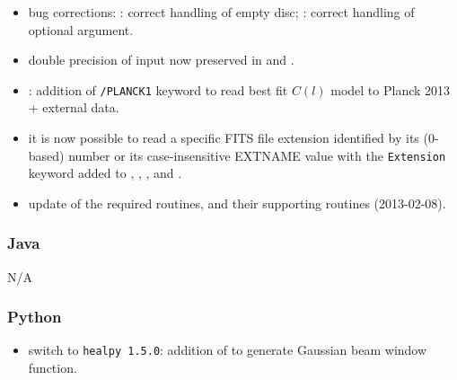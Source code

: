 \documentclass[12pt,twoside]{article}
\newcommand{\linklatexhtml}[3]{%
\latexhtml{\htmladdnormallink{#1}{#2}}{\htmladdnormallink{#1}{#3}}}
\begin{document}
\subsubsection[IDL]{\linklatexhtml{IDL}{idl.pdf}{idl.htm}}
\begin{itemize}
	\item bug corrections: 
	: correct handling of empty disc; 
	: correct handling of optional argument.

	\item double precision of input now preserved in
	 and 
	.

	\item {}: addition of 
	{\tt /PLANCK1} keyword
	to read best fit $C(l)$ model to Planck 2013 + external data.

	\item it is now possible to read a specific FITS file extension identified by its
	(0-based) number or its case-insensitive EXTNAME value with the {\tt Extension}
	keyword added to 
	,
	,
	,
	 and 
	.

	\item update of the required
	routines, and their supporting 
	routines (2013-02-08).
\end{itemize}

%
\subsubsection[Java]{Java}
N/A%
\subsubsection[Python]{Python}
\begin{itemize}
	\item	switch to {\tt healpy 1.5.0}: addition of 
to generate Gaussian beam window function.
\end{itemize}
\end{document}
